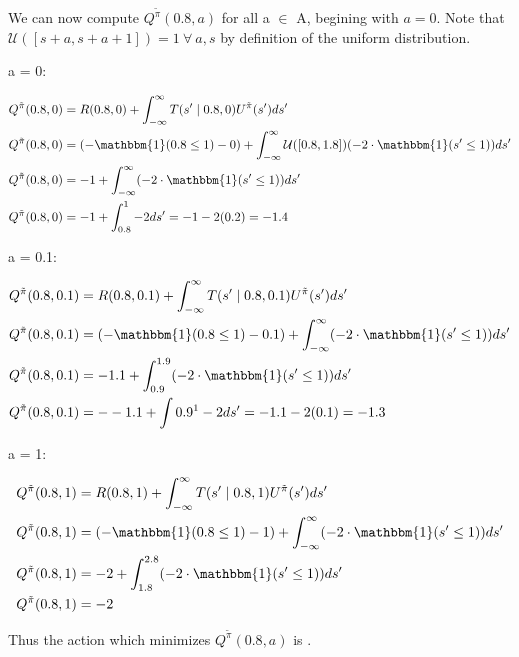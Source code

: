 \documentclass[11pt]{article}
\begin{document}
\begin{enumerate}[label=\alph*)]
    We can now compute $Q^{\tilde{\pi}}(0.8,a)$ for all a $\in$ A, begining with $a = 0$. Note that $\mathcal{U}([s+a,s+a+1]) = 1 \ \forall \ a,s$ by definition
    of the uniform distribution. \newline

    a = 0:

    \[
    \begin{aligned}
        Q^{\tilde{\pi}}(0.8,0) &= R(0.8,0) + \int_{-\infty}^{\infty} T(s' \mid 0.8,0)U^{\tilde{\pi}}(s') ds' \\ 
        Q^{\tilde{\pi}}(0.8,0) &= (-\mathbbm{1}(0.8 \leq 1) - 0) + \int_{-\infty}^{\infty} \mathcal{U}([0.8,1.8])(-2\cdot\mathbbm{1}(s' \leq 1)) ds' \\
        Q^{\tilde{\pi}}(0.8,0) &= -1 + \int_{-\infty}^{\infty} (-2\cdot\mathbbm{1}(s' \leq 1)) ds' \\
        Q^{\tilde{\pi}}(0.8,0) &= - 1 + \int_{0.8}^1 -2 ds' = -1 - 2(0.2) = -1.4
    \end{aligned}
    \]

    a = 0.1:

    \[
    \begin{aligned}
        Q^{\tilde{\pi}}(0.8,0.1) &= R(0.8,0.1) + \int_{-\infty}^{\infty} T(s' \mid 0.8,0.1)U^{\tilde{\pi}}(s') ds' \\ 
        Q^{\tilde{\pi}}(0.8,0.1) &= (-\mathbbm{1}(0.8 \leq 1) - 0.1) + \int_{-\infty}^{\infty} (-2\cdot\mathbbm{1}(s' \leq 1)) ds' \\
        Q^{\tilde{\pi}}(0.8,0.1) &= -1.1 + \int_{0.9}^{1.9} (-2\cdot\mathbbm{1}(s' \leq 1)) ds' \\
        Q^{\tilde{\pi}}(0.8,0.1) &= - -1.1 + \int{0.9}^{1} -2 ds' = -1.1 - 2(0.1) = -1.3 
    \end{aligned}
    \]

    a = 1:

    \[
    \begin{aligned}
        Q^{\tilde{\pi}}(0.8,1) &= R(0.8,1) + \int_{-\infty}^{\infty} T(s' \mid 0.8,1)U^{\tilde{\pi}}(s') ds' \\ 
        Q^{\tilde{\pi}}(0.8,1) &= (-\mathbbm{1}(0.8 \leq 1) - 1) + \int_{-\infty}^{\infty} (-2\cdot\mathbbm{1}(s' \leq 1)) ds' \\
        Q^{\tilde{\pi}}(0.8,1) &= -2 + \int_{1.8}^{2.8} (-2\cdot\mathbbm{1}(s' \leq 1)) ds' \\
        Q^{\tilde{\pi}}(0.8,1) &= -2
    \end{aligned}
    \]

    Thus the action which minimizes $Q^{\tilde{\pi}}(0.8,a)$ is .

\end{enumerate}
\end{document}
